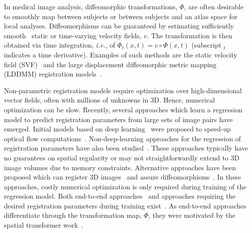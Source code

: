 \documentclass[10pt,twocolumn,letterpaper,table]{article}
\numberwithin{equation}{section}
\theoremstyle{plain}
\theoremstyle{definition}
\def\ie{\emph{i.e.}}  \def\Ie{\emph{I.e.}}
\begin{document}
In medical image analysis, diffeomorphic transformations, $\Phi$, are often desirable to smoothly map between subjects or between subjects and an atlas space for local analyses. Diffeomorphisms can be guaranteed by estimating sufficiently smooth~\cite{dupuis1998} static or time-varying velocity fields, $v$. The transformation is then obtained via time integration, \ie, of $\Phi_t(x,t) = v\circ\Phi(x,t)$ (subscript $_t$ indicates a time derivative). Examples of such methods are the static velocity field (SVF)~\cite{vercauteren2009diffeomorphic} and the large displacement diffeomorphic metric mapping (LDDMM) registration models~\cite{beg2005,vialard2012diffeomorphic,hart2009optimal,avants2009advanced}. 

Non-parametric registration models require optimization over high-dimensional vector fields, often with millions of unknowns in 3D. Hence, numerical optimization can be slow. Recently, several approaches which learn a regression model to predict registration parameters from large sets of image pairs have emerged. Initial models based on deep learning~\cite{dosovitskiy2015flownet,ilg2017flownet} were proposed to speed-up optical flow computations~\cite{horn1981determining,beauchemin1995computation,brox2004high,borzi2003optimal,zach2007duality, sun2010secrets}. Non-deep-learning approaches for the regression of registration parameters have also been studied~\cite{wang2013joint,wang2015predict,chou20132d,cao2015semi,gutierrez2017guiding}. These approaches typically have no guarantees on spatial regularity or may not straightforwardly extend to 3D image volumes due to memory constraints. Alternative approaches have been proposed which can register 3D images~\cite{rohe2017svf,sokooti2017nonrigid,de2017end,hu2018label,balakrishnan2018unsupervised,fan2018adversarial} and assure diffeomorphisms~\cite{yang2016fast,yang2017quicksilver}. In these approaches, costly numerical optimization is only required during training of the regression model. Both end-to-end approaches~\cite{de2017end,hu2018label,balakrishnan2018unsupervised,fan2018adversarial} and approaches requiring the desired registration parameters during training exist~\cite{yang2016fast,yang2017quicksilver,rohe2017svf}. As end-to-end approaches differentiate through the transformation map, $\Phi$, they were motivated by the spatial transformer work~\cite{jaderberg2015spatial}.
\end{document}
